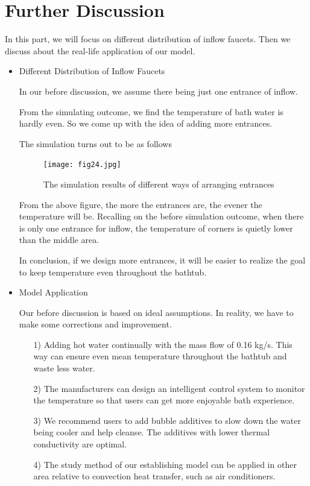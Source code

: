 \documentclass{mcmthesis}
\begin{document}
\section{Further Discussion}

In this part, we will focus on different distribution of inflow faucets. Then we discuss about the real-life application of our model.

\begin{itemize}
\item Different Distribution of Inflow Faucets

In our before discussion, we assume there being just one entrance of inflow.

From the simulating outcome, we find the temperature of bath water is hardly even. So we come up with the idea of adding more entrances.

The simulation turns out to be as follows

\begin{figure}[h] 
\centering
\texttt{[image: fig24.jpg]}
\caption{The simulation results of different ways of arranging entrances} \label{fig24}
\end{figure}

From the above figure, the more the entrances are, the evener the temperature will be. Recalling on the before simulation outcome, when there is only one entrance for inflow, the temperature of corners is quietly lower than the middle area.

In conclusion, if we design more entrances, it will be easier to realize the goal to keep temperature even throughout the bathtub.

\item Model Application

Our before discussion is based on ideal assumptions. In reality, we have to make some corrections and improvement.

\begin{itemize}
\item[1)] Adding hot water continually with the mass flow of 0.16 kg/s. This way can ensure even mean temperature throughout the bathtub and waste less water.

\item[2)] The manufacturers can design an intelligent control system to monitor the temperature so that users can get more enjoyable bath experience.

\item[3)] We recommend users to add bubble additives to slow down the water being cooler and help cleanse. The additives with lower thermal conductivity are optimal.

\item[4)] The study method of our establishing model can be applied in other area relative to convection heat transfer, such as air conditioners.
\end{itemize}
\end{itemize}
\newpage
{} %
\thispagestyle{empty} %
\end{document}
